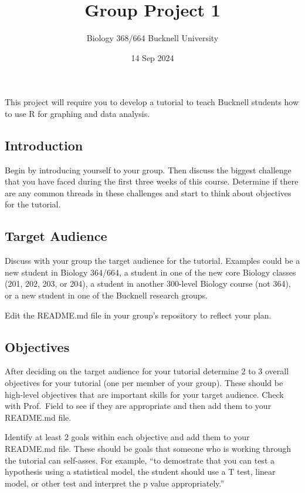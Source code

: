 \documentclass[
]{article}
\title{Group Project 1}
\subtitle{Biology 368/664 Bucknell University}
\author{}
\date{\vspace{-2.5em}14 Sep 2024}
\begin{document}
\maketitle

This project will require you to develop a tutorial to teach Bucknell
students how to use R for graphing and data analysis.

\subsection{Introduction}\label{introduction}

Begin by introducing yourself to your group. Then discuss the biggest
challenge that you have faced during the first three weeks of this
course. Determine if there are any common threads in these challenges
and start to think about objectives for the tutorial.

\subsection{Target Audience}\label{target-audience}

Discuss with your group the target audience for the tutorial. Examples
could be a new student in Biology 364/664, a student in one of the new
core Biology classes (201, 202, 203, or 204), a student in another
300-level Biology course (not 364), or a new student in one of the
Bucknell research groups.

Edit the README.md file in your group's repository to reflect your plan.

\subsection{Objectives}\label{objectives}

After deciding on the target audience for your tutorial determine 2 to 3
overall objectives for your tutorial (one per member of your group).
These should be high-level objectives that are important skills for your
target audience. Check with Prof.~Field to see if they are appropriate
and then add them to your README.md file.

Identify at least 2 goals within each objective and add them to your
README.md file. These should be goals that someone who is working
through the tutorial can self-asses. For example, ``to demostrate that
you can test a hypothesis using a statistical model, the student should
use a T test, linear model, or other test and interpret the p value
appropriately.''
\end{document}
